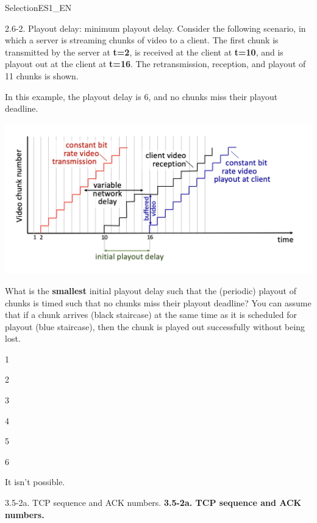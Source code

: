 \documentclass[a4paper]{article}
\begin{document}
\begin{quiz}{SelectionES1\_EN}
\begin{multi}[points=1,shuffle]{2.6-2. Playout delay: minimum playout delay.}
Consider the following scenario, in which a server is streaming chunks of video to a client. The first chunk is transmitted by the server at \textbf{t=2}, is received at the client at \textbf{t=10}, and is playout out at the client at \textbf{t=16}.  The retransmission, reception, and playout of 11 chunks is shown. 

In this example, the playout delay is 6, and no chunks miss their playout deadline.
\begin{center}
\includegraphics[width=\linewidth]{figs/playout_delay.jpg}
\end{center}

What is the \textbf{smallest} initial playout delay such that the (periodic) playout of chunks is timed such that no chunks miss their playout deadline? You can assume that if a chunk arrives (black staircase) at the same time as it is scheduled for playout (blue staircase), then the chunk is played out successfully without being lost.
\item 1
\item 2
\item 3
\item* 4
\item 5
\item 6
\item It isn't possible.
\end{multi}

\begin{multi}[points=1,shuffle]{3.5-2a. TCP sequence and ACK numbers.}
\textbf{3.5-2a. TCP sequence and ACK numbers.}


\end{multi}
\end{quiz}
\end{document}
